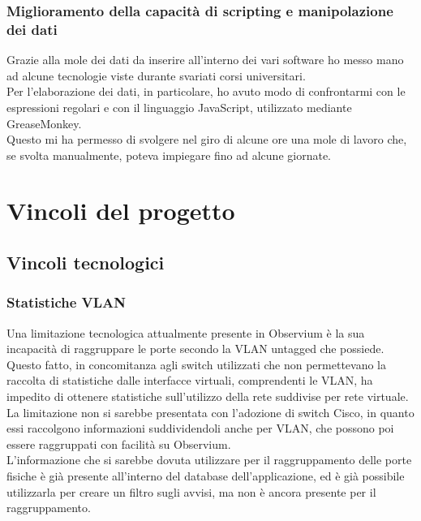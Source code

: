 \documentclass[Tesi.tex]{subfiles}
\begin{document}
\subsubsection{Miglioramento della capacità di scripting e manipolazione dei dati}
Grazie alla mole dei dati da inserire all'interno dei vari software ho messo mano ad alcune tecnologie viste durante svariati corsi universitari. \\
Per l'elaborazione dei dati, in particolare, ho avuto modo di confrontarmi con le espressioni regolari e con il linguaggio JavaScript, utilizzato mediante GreaseMonkey. \\
Questo mi ha permesso di svolgere nel giro di alcune ore una mole di lavoro che, se svolta manualmente, poteva impiegare fino ad alcune giornate.

\newpage
\section{Vincoli del progetto}
\subsection{Vincoli tecnologici}
\subsubsection{Statistiche VLAN}
Una limitazione tecnologica attualmente presente in Observium è la sua incapacità di raggruppare le porte secondo la VLAN untagged che possiede. \\
Questo fatto, in concomitanza agli switch utilizzati che non permettevano la raccolta di statistiche dalle interfacce virtuali, comprendenti le VLAN, ha impedito di ottenere statistiche sull'utilizzo della rete suddivise per rete virtuale. \\
La limitazione non si sarebbe presentata con l'adozione di switch Cisco, in quanto essi raccolgono informazioni suddividendoli anche per VLAN, che possono poi essere raggruppati con facilità su Observium. \\
L'informazione che si sarebbe dovuta utilizzare per il raggruppamento delle porte fisiche è già presente all'interno del database dell'applicazione, ed è già possibile utilizzarla per creare un filtro sugli avvisi, ma non è ancora presente per il raggruppamento.
\end{document}
